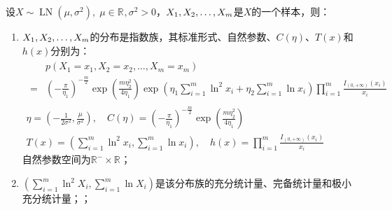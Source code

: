 \begin{theorem}
	设$X\sim\operatorname{LN}(\mu,\sigma^2),\;\mu\in\mathbb{R}^{},\sigma^2>0$，$X_1, X_2, \dots, X_{m}$是$X$的一个样本，则：
	\begin{enumerate}
		\item $X_1, X_2, \dots, X_{m}$的分布是指数族，其标准形式、自然参数、$C(\eta)$、$T(x)$和$h(x)$分别为：
		\begin{gather*}
			\begin{aligned}
				&p(X_1=x_1,X_2=x_2,\dots,X_m=x_m) \\
				=&\left(-\frac{\pi}{\eta_1}\right)^{-\frac{m}{2}}\exp\left(\frac{m\eta_2^2}{4\eta_1}\right)\exp\left(\eta_1\sum_{i=1}^{m}\ln^2 x_i+\eta_2\sum_{i=1}^{m}\ln x_i\right)\prod_{i=1}^{m}\frac{I_{(0,+\infty)}(x_i)}{x_i}
			\end{aligned} \\
			\eta=\left(-\frac{1}{2\sigma^2},\frac{\mu}{\sigma^2}\right),\quad C(\eta)=\left(-\frac{\pi}{\eta_1}\right)^{-\frac{m}{2}}\exp\left(\frac{m\eta_2^2}{4\eta_1}\right) \\
			T(x)=\left(\sum_{i=1}^{m}\ln^2 x_i,\sum_{i=1}^{m}\ln x_i\right),\quad h(x)=\prod_{i=1}^{m}\frac{I_{(0,+\infty)}(x_i)}{x_i}
		\end{gather*}
		自然参数空间为$\mathbb{R}^{-}\times\mathbb{R}^{}$；
		\item $\left(\sum\limits_{i=1}^{m}\ln^2 X_i,\sum\limits_{i=1}^{m}\ln X_i\right)$是该分布族的充分统计量、完备统计量和极小充分统计量；；
	\end{enumerate}
\end{theorem}
